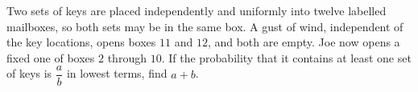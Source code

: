 Two sets of keys are placed independently and uniformly into twelve labelled mailboxes, so both sets may be in the same box. A gust of wind, independent of the key locations, opens boxes $11$ and $12$, and both are empty. Joe now opens a fixed one of boxes $2$ through $10$. If the probability that it contains at least one set of keys is $\dfrac{a}{b}$ in lowest terms, find $a+b$.
